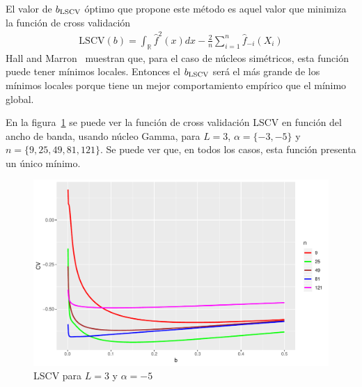 El valor de $b_{\tiny \text{LSCV}}$ óptimo que propone este método es aquel valor que minimiza la función de cross validación 
\begin{align}
	\text{LSCV}(b)=\int_\mathbb{R} \widehat{f}^2(x)dx - \frac{2}{n}\sum_{i=1}^n \widehat{f}_{-i}(X_i)
	\label{LSCV}
\end{align}
Hall and Marron~\cite{HallMarron1991} muestran que, para el caso de núcleos simétricos, esta función puede tener mínimos locales. Entonces el  $b_{\tiny \text{LSCV}}$ será el más grande de los mínimos locales porque tiene un mejor comportamiento empírico que el mínimo global.

En la figura~\ref{LSCV} se puede ver la función de cross validación LSCV en función del ancho de banda, usando núcleo Gamma, para $L=3$, $\alpha=\{-3,-5\}$ y $n=\{9,25,49,81,121\}$. Se puede ver que, en todos los casos, esta función presenta un único mínimo.

\begin{figure}[hbt]
	\centering 
	\label{LSCV}
	\includegraphics[scale=0.5]{../../Figures/Tesis/Capitulo4/GraficoLSCValfa=-5.pdf}
	\caption{LSCV para $L=3$ y $\alpha=-5$}
\end{figure}


